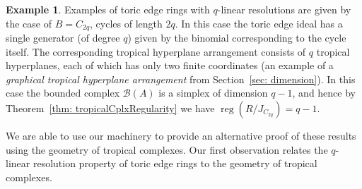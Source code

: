 \documentclass[11pt]{article}
\theoremstyle{definition}
\newtheorem{example}[theo]{Example}
\numberwithin{equation}{section}
\newcommand{\cB}{\mathcal{B}}
\newcommand{\reg}{\operatorname{reg}}
\begin{document}
\begin{example}
Examples of toric edge rings with $q$-linear resolutions are given by the case of $B = C_{2q}$, cycles of length $2q$.  In this case the toric edge ideal has a single generator (of degree $q$) given by the binomial corresponding to the cycle itself.  The corresponding tropical hyperplane arrangement consists of $q$ tropical hyperplanes, each of which has only two finite coordinates (an example of a \emph{graphical tropical hyperplane arrangement} from Section~\ref{sec: dimension}). In this case the bounded complex $\cB(A)$ is a simplex of dimension $q-1$, and hence by Theorem~\ref{thm: tropicalCplxRegularity} we have $\reg(R/J_{C_{2q}}) = q-1$.
\end{example}

We are able to use our machinery to provide an alternative proof of these results using the geometry of tropical complexes.  Our first observation relates the $q$-linear resolution property of toric edge rings to the geometry of tropical complexes.
\end{document}
